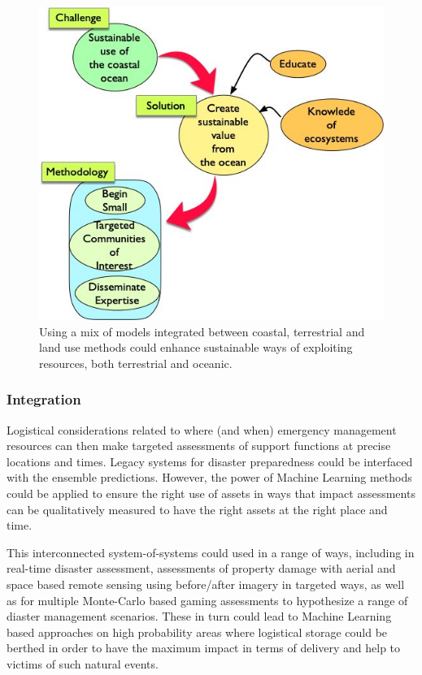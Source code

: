 \begin{figure}
  \centering
  \includegraphics[scale=0.40]{fig/Ericeira-method.jpg}
  \caption{Using a mix of models integrated between coastal, terrestrial
    and land use methods could enhance sustainable ways of exploiting
    resources, both terrestrial and oceanic.}
  \label{fig:method}
\end{figure}


\subsubsection*{Integration}

Logistical considerations related to where (and when) emergency
management resources can then make targeted assessments of support
functions at precise locations and times. Legacy systems for disaster
preparedness could be interfaced with the ensemble
predictions. However, the power of Machine Learning methods could be
applied to ensure the right use of assets in ways that impact
assessments can be qualitatively measured to have the right assets at
the right place and time. 

This interconnected system-of-systems could used in a range of ways,
including in real-time disaster assessment, assessments of property
damage with aerial and space based remote sensing using before/after
imagery in targeted ways, as well as for multiple Monte-Carlo based
gaming assessments to hypothesize a range of diaster management
scenarios. These in turn could lead to Machine Learning based approaches
on high probability areas where logistical storage could be berthed in
order to have the maximum impact in terms of delivery and help to
victims of such natural events.

